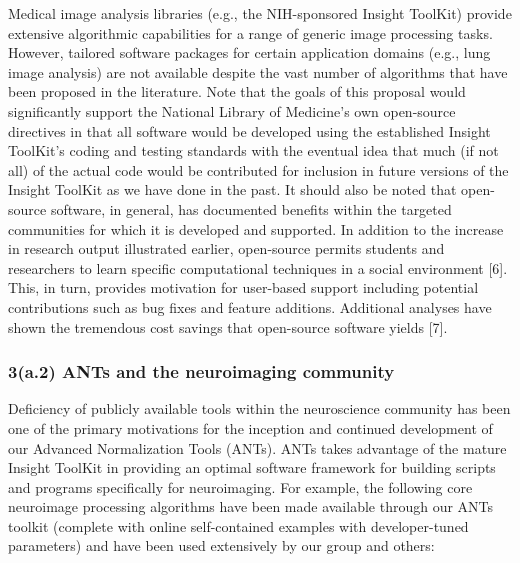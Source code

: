 \documentclass[11pt,]{article}
\begin{document}
Medical image analysis libraries (e.g., the NIH-sponsored Insight
ToolKit) provide extensive algorithmic capabilities for a range of
generic image processing tasks. However, tailored software packages for
certain application domains (e.g., lung image analysis) are not
available despite the vast number of algorithms that have been proposed
in the literature. Note that the goals of this proposal would
significantly support the National Library of Medicine's own open-source
directives in that all software would be developed using the established
Insight ToolKit's coding and testing standards with the eventual idea
that much (if not all) of the actual code would be contributed for
inclusion in future versions of the Insight ToolKit as we have done in
the past. It should also be noted that open-source software, in general,
has documented benefits within the targeted communities for which it is
developed and supported. In addition to the increase in research output
illustrated earlier, open-source permits students and researchers to
learn specific computational techniques in a social environment {[}6{]}.
This, in turn, provides motivation for user-based support including
potential contributions such as bug fixes and feature additions.
Additional analyses have shown the tremendous cost savings that
open-source software yields {[}7{]}.

\subsubsection{3(a.2) ANTs and the neuroimaging
community}\label{a.2-ants-and-the-neuroimaging-community}

Deficiency of publicly available tools within the neuroscience community
has been one of the primary motivations for the inception and continued
development of our Advanced Normalization Tools (ANTs). ANTs takes
advantage of the mature Insight ToolKit in providing an optimal software
framework for building scripts and programs specifically for
neuroimaging. For example, the following core neuroimage processing
algorithms have been made available through our ANTs toolkit (complete
with online self-contained examples with developer-tuned parameters) and
have been used extensively by our group and others:
\end{document}
